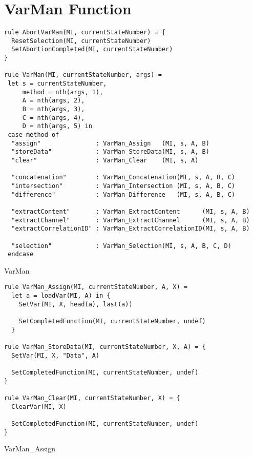 \section{VarMan Function}

\begin{listing}[H]
\begin{verbatim}
rule AbortVarMan(MI, currentStateNumber) = {
  ResetSelection(MI, currentStateNumber)
  SetAbortionCompleted(MI, currentStateNumber)
}

rule VarMan(MI, currentStateNumber, args) =
 let s = currentStateNumber,
     method = nth(args, 1),
     A = nth(args, 2),
     B = nth(args, 3),
     C = nth(args, 4),
     D = nth(args, 5) in
 case method of
  "assign"               : VarMan_Assign   (MI, s, A, B)
  "storeData"            : VarMan_StoreData(MI, s, A, B)
  "clear"                : VarMan_Clear    (MI, s, A)

  "concatenation"        : VarMan_Concatenation(MI, s, A, B, C)
  "intersection"         : VarMan_Intersection (MI, s, A, B, C)
  "difference"           : VarMan_Difference   (MI, s, A, B, C)

  "extractContent"       : VarMan_ExtractContent      (MI, s, A, B)
  "extractChannel"       : VarMan_ExtractChannel      (MI, s, A, B)
  "extractCorrelationID" : VarMan_ExtractCorrelationID(MI, s, A, B)

  "selection"            : VarMan_Selection(MI, s, A, B, C, D)
 endcase
\end{verbatim}
\caption{VarMan}
\label{lst:asm:VarMan}
\end{listing}




\begin{listing}[H]
\begin{verbatim}
rule VarMan_Assign(MI, currentStateNumber, A, X) =
  let a = loadVar(MI, A) in {
    SetVar(MI, X, head(a), last(a))

    SetCompletedFunction(MI, currentStateNumber, undef)
  }

rule VarMan_StoreData(MI, currentStateNumber, X, A) = {
  SetVar(MI, X, "Data", A)

  SetCompletedFunction(MI, currentStateNumber, undef)
}

rule VarMan_Clear(MI, currentStateNumber, X) = {
  ClearVar(MI, X)

  SetCompletedFunction(MI, currentStateNumber, undef)
}
\end{verbatim}
\caption{VarMan\_Assign}
\label{lst:asm:VarMan_Assign}
\end{listing}





